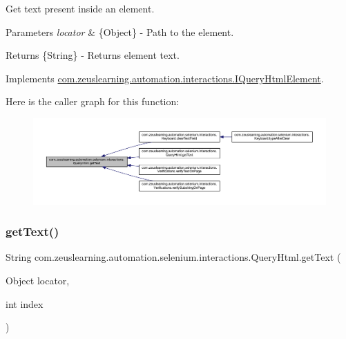 Get text present inside an element.


\begin{DoxyParams}{Parameters}
{\em locator} & \{Object\} -\/ Path to the element. \\
\hline
\end{DoxyParams}
\begin{DoxyReturn}{Returns}
\{String\} -\/ Returns element text. 
\end{DoxyReturn}


Implements \hyperlink{interfacecom_1_1zeuslearning_1_1automation_1_1interactions_1_1IQueryHtmlElement_a246f2ac4d1610d263899d640db02f3ae}{com.\+zeuslearning.\+automation.\+interactions.\+I\+Query\+Html\+Element}.

Here is the caller graph for this function\+:
\nopagebreak
\begin{figure}[H]
\begin{center}
\leavevmode
\includegraphics[width=350pt]{dc/d41/classcom_1_1zeuslearning_1_1automation_1_1selenium_1_1interactions_1_1QueryHtml_a9635c7b4c91241fc2896d317ca4121ef_icgraph}
\end{center}
\end{figure}
\hypertarget{classcom_1_1zeuslearning_1_1automation_1_1selenium_1_1interactions_1_1QueryHtml_a3f03bea9d1ab38fb888d2f2c629f297e}{}\label{classcom_1_1zeuslearning_1_1automation_1_1selenium_1_1interactions_1_1QueryHtml_a3f03bea9d1ab38fb888d2f2c629f297e} 
\subsubsection{\texorpdfstring{get\+Text()}{getText()}\hspace{0.1cm}{\footnotesize\ttfamily [2/2]}}
{\footnotesize\ttfamily String com.\+zeuslearning.\+automation.\+selenium.\+interactions.\+Query\+Html.\+get\+Text (\begin{DoxyParamCaption}\item[{Object}]{locator,  }\item[{int}]{index }\end{DoxyParamCaption})\hspace{0.3cm}{\ttfamily [inline]}}


